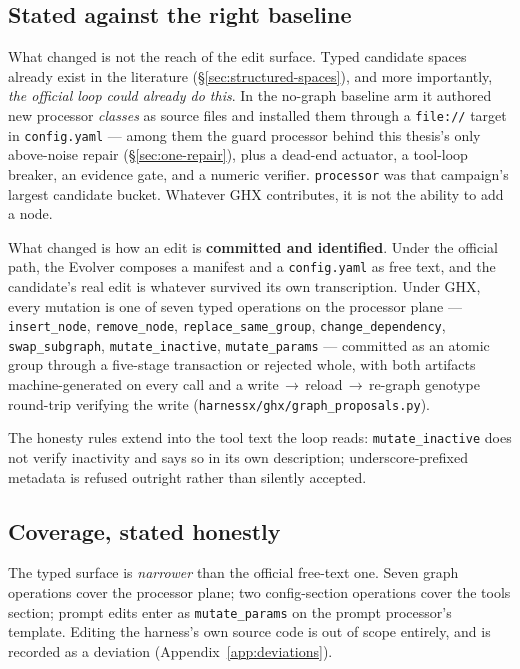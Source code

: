 \subsection*{Stated against the right baseline}

What changed is not the reach of the edit surface. Typed candidate spaces
already exist in the literature (\S\ref{sec:structured-spaces}), and more
importantly, \emph{the official loop could already do this}. In the
no-graph baseline arm it authored new processor \emph{classes} as source
files and installed them through a \texttt{file://} target in
\texttt{config.yaml} --- among them the guard processor behind this
thesis's only above-noise repair (\S\ref{sec:one-repair}), plus a dead-end
actuator, a tool-loop breaker, an evidence gate, and a numeric verifier.
\texttt{processor} was that campaign's largest candidate bucket. Whatever
GHX contributes, it is not the ability to add a node.

What changed is how an edit is \textbf{committed and identified}. Under the
official path, the Evolver composes a manifest and a \texttt{config.yaml}
as free text, and the candidate's real edit is whatever survived its own
transcription. Under GHX, every mutation is one of seven typed operations
on the processor plane --- \texttt{insert\_node}, \texttt{remove\_node},
\texttt{replace\_same\_group}, \texttt{change\_dependency},
\texttt{swap\_subgraph}, \texttt{mutate\_inactive}, \texttt{mutate\_params}
--- committed as an atomic group through a five-stage transaction or
rejected whole, with both artifacts machine-generated on every call and a
write\,$\to$\,reload\,$\to$\,re-graph genotype round-trip verifying the
write (\texttt{harnessx/ghx/graph\_proposals.py}).

The honesty rules extend into the tool text the loop reads:
\texttt{mutate\_inactive} does not verify inactivity and says so in its own
description; underscore-prefixed metadata is refused outright rather than
silently accepted.

\subsection*{Coverage, stated honestly}

The typed surface is \emph{narrower} than the official free-text one. Seven
graph operations cover the processor plane; two config-section operations
cover the tools section; prompt edits enter as \texttt{mutate\_params} on
the prompt processor's template. Editing the harness's own source code is
out of scope entirely, and is recorded as a deviation
(Appendix~\ref{app:deviations}).

